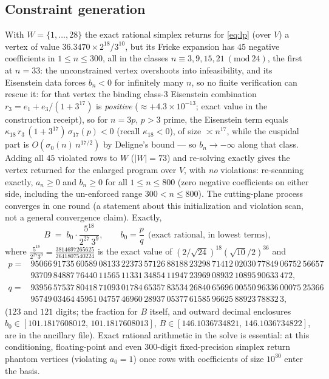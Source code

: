 \documentclass[11pt]{article}
\theoremstyle{remark}
\begin{document}
\subsection{Constraint generation}

With $W=\{1,\dots,28\}$ the exact rational simplex returns for
\eqref{eq:lp} (over $V$) a vertex of value $36.3470\times 2^{18}/3^{10}$,
but its Fricke expansion has $45$
negative coefficients in $1\le n\le 300$, all in the classes
$n\equiv3,9,15,21\  (\mathrm{mod}\ 24)$, the first at $n=33$: the
unconstrained vertex overshoots into infeasibility, and its Eisenstein
data forces $b_n<0$ for infinitely many $n$, so no finite verification
can rescue it: for that vertex the binding class-$3$ Eisenstein
combination $r_3=e_1+e_3/(1+3^{17})$ is \emph{positive}
($\approx+4.3\times10^{-13}$; exact value in the construction receipt),
so for $n=3p$, $p>3$ prime, the Eisenstein term equals
$\kappa_{18}\,r_3\,(1+3^{17})\,\sigma_{17}(p)<0$ (recall
$\kappa_{18}<0$), of size $\asymp n^{17}$, while the cuspidal part is
$O(\sigma_0(n)\,n^{17/2})$ by Deligne's bound --- so $b_n\to-\infty$
along that class. Adding all $45$ violated rows to $W$
($|W|=73$) and re-solving exactly gives the vertex returned for the
enlarged program over $V$, with \emph{no} violations: re-scanning
exactly, $a_n\ge0$ and $b_n\ge0$ for all $1\le n\le 800$ (zero negative
coefficients on either side, including the un-enforced range
$300<n\le800$). The cutting-plane process converges in one round (a
statement about this initialization and violation scan, not a general
convergence claim).
Exactly,
\begin{equation}\label{eq:exactB}
B \;=\; b_0\cdot\frac{5^{18}}{2^{27}\,3^{9}},
\qquad
b_0=\frac{p}{q}\ \ \text{(exact rational, in lowest terms)},
\end{equation}
where $\tfrac{5^{18}}{2^{27}3^{9}}=\tfrac{3814697265625}{2641807540224}$
is the exact value of $(2/\sqrt{24})^{18}(\sqrt{10}/2)^{36}$ and
{\small
\begin{align*}
p={}&95066\,91735\,60589\,08133\,22373\,57126\,88188\,23298\,71412\,02030\,77849\,06752\,56657\\
&93709\,84887\,76440\,11565\,11331\,34854\,11947\,23969\,08932\,10895\,90633\,472,\\
q={}&93956\,57537\,80418\,71093\,01784\,65357\,83534\,26840\,65696\,00550\,96336\,00075\,25366\\
&95749\,03464\,45951\,04757\,46960\,28937\,05377\,61585\,96625\,88923\,78832\,3,
\end{align*}}%
($123$ and $121$ digits; the fraction for $B$ itself, and outward
decimal enclosures $b_0\in[101.1817608012,\,101.1817608013]$,
$B\in[146.1036734821,\,146.1036734822]$, are in the ancillary file).
Exact rational arithmetic in the solve
is essential: at this conditioning, floating-point and even
$300$-digit fixed-precision simplex return phantom vertices (violating
$a_0=1$) once rows with coefficients of size $10^{30}$ enter the basis.
\end{document}
